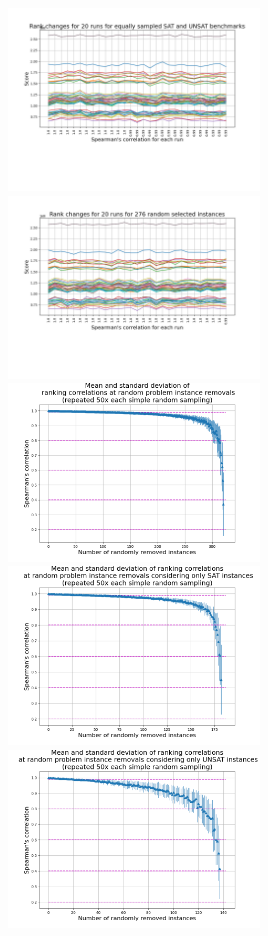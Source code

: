 \documentclass{elsarticle}
\begin{document}
\includegraphics[width=0.5\textwidth]{stability/50-50-sat-unsat_random_sampling_scores.png}%
\includegraphics[width=0.5\textwidth]{stability/276_instances_random_sampling_scores.png}
\includegraphics[width=0.5\textwidth]{stability/ALL_random_smpling_correlations.png}%
\includegraphics[width=0.5\textwidth]{stability/SAT_randomSampling_correlations.png}
\includegraphics[width=0.5\textwidth]{stability/UNSAT_randomSampling_correlations.png}
\end{document}
